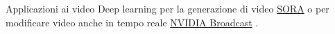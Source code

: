 \documentclass{beamer}
\begin{document}
\begin{frame}{Applicazioni ai video}
    Deep learning per la generazione di video \href{https://openai.com/index/sora/}{SORA}  o per modificare video anche in tempo reale \href{https://www.nvidia.com/it-it/geforce/broadcasting/broadcast-app/}{NVIDIA Broadcast} .
    \vspace{-0.6cm}
    \begin{columns}[T] %
        \begin{column}{.33\textwidth}
            \begin{center}
            \end{center}
        \end{column}%
        \begin{column}{.33\textwidth}
            \begin{center}

\end{center}
\end{column}
\end{columns}
\end{frame}
\end{document}
